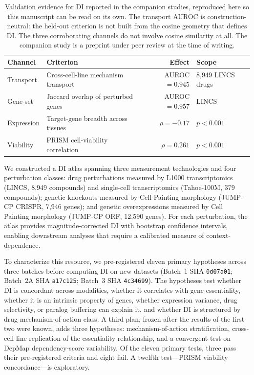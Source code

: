 \documentclass[11pt]{article}
\begin{document}
\vspace{1em}
\begin{table}[htbp]
\centering
\caption{Validation evidence for DI reported in the companion studies, reproduced
here so this manuscript can be read on its own.  The transport AUROC is
construction-neutral: the held-out criterion is not built from the cosine
geometry that defines DI.  The three corroborating channels do not involve
cosine similarity at all.  The companion study is a preprint under peer review
at the time of writing.}
\label{tab:companion}
\small
\begin{tabular}{@{}llrl@{}}
\toprule
\textbf{Channel} & \textbf{Criterion} & \textbf{Effect} & \textbf{Scope} \\
\midrule
Transport      & Cross-cell-line mechanism transport & AUROC $= 0.945$ & 8{,}949 LINCS drugs \\
Gene-set       & Jaccard overlap of perturbed genes  & AUROC $= 0.957$ & LINCS \\
Expression     & Target-gene breadth across tissues  & $\rho = -0.17$  & $p < 0.001$ \\
Viability      & PRISM cell-viability correlation    & $\rho = 0.261$  & $p < 0.001$ \\
\bottomrule
\end{tabular}
\end{table}

We constructed a DI atlas spanning three measurement technologies and
four perturbation classes: drug perturbations measured by L1000
transcriptomics (LINCS, 8{,}949 compounds) and single-cell
transcriptomics (Tahoe-100M, 379 compounds); genetic knockouts measured
by Cell Painting morphology (JUMP-CP CRISPR, 7{,}946 genes); and
genetic overexpressions measured by Cell Painting morphology (JUMP-CP
ORF, 12{,}590 genes).  For each perturbation, the atlas provides
magnitude-corrected DI with bootstrap confidence intervals, enabling
downstream analyses that require a calibrated measure of
context-dependence.

To characterize this resource, we pre-registered eleven primary
hypotheses across three batches before computing DI on new datasets
(Batch~1 SHA \texttt{0d07a01}; Batch~2A SHA \texttt{a17c125};
Batch~3 SHA \texttt{4c34699}).  The
hypotheses test whether DI is concordant across modalities,
whether it correlates with gene essentiality, whether it is an
intrinsic property of genes, whether expression variance,
drug selectivity, or paralog buffering can explain it, and whether
DI is structured by drug mechanism-of-action class.
A third plan, frozen after the results of the first two were known, adds three
hypotheses: mechanism-of-action stratification, cross-cell-line replication of
the essentiality relationship, and a convergent test on DepMap
dependency-score variability.
Of the eleven primary tests, three pass their pre-registered criteria
and eight fail.  A twelfth test---PRISM viability concordance---is
exploratory.
\end{document}
